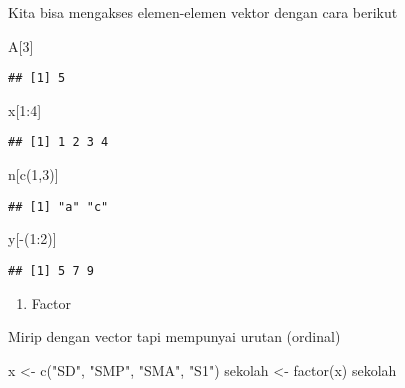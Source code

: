 \documentclass[
]{book}
\newenvironment{Shaded}{\begin{snugshade}}{\end{snugshade}}
\newcommand{\DecValTok}[1]{\textcolor[rgb]{0.00,0.00,0.81}{#1}}
\newcommand{\FunctionTok}[1]{\textcolor[rgb]{0.00,0.00,0.00}{#1}}
\newcommand{\NormalTok}[1]{#1}
\newcommand{\OtherTok}[1]{\textcolor[rgb]{0.56,0.35,0.01}{#1}}
\newcommand{\SpecialCharTok}[1]{\textcolor[rgb]{0.00,0.00,0.00}{#1}}
\newcommand{\StringTok}[1]{\textcolor[rgb]{0.31,0.60,0.02}{#1}}
\providecommand{\tightlist}{%
  \setlength{\itemsep}{0pt}\setlength{\parskip}{0pt}}
\begin{document}
Kita bisa mengakses elemen-elemen vektor dengan cara berikut

\begin{Shaded}
\begin{Highlighting}[]
\NormalTok{A[}\DecValTok{3}\NormalTok{]}
\end{Highlighting}
\end{Shaded}

\begin{verbatim}
## [1] 5
\end{verbatim}

\begin{Shaded}
\begin{Highlighting}[]
\NormalTok{x[}\DecValTok{1}\SpecialCharTok{:}\DecValTok{4}\NormalTok{]}
\end{Highlighting}
\end{Shaded}

\begin{verbatim}
## [1] 1 2 3 4
\end{verbatim}

\begin{Shaded}
\begin{Highlighting}[]
\NormalTok{n[}\FunctionTok{c}\NormalTok{(}\DecValTok{1}\NormalTok{,}\DecValTok{3}\NormalTok{)]}
\end{Highlighting}
\end{Shaded}

\begin{verbatim}
## [1] "a" "c"
\end{verbatim}

\begin{Shaded}
\begin{Highlighting}[]
\NormalTok{y[}\SpecialCharTok{{-}}\NormalTok{(}\DecValTok{1}\SpecialCharTok{:}\DecValTok{2}\NormalTok{)]}
\end{Highlighting}
\end{Shaded}

\begin{verbatim}
## [1] 5 7 9
\end{verbatim}

\begin{enumerate}
\def\labelenumi{\arabic{enumi}.}
\setcounter{enumi}{1}
\tightlist
\item
  Factor
\end{enumerate}

Mirip dengan vector tapi mempunyai urutan (ordinal)

\begin{Shaded}
\begin{Highlighting}[]
\NormalTok{x }\OtherTok{\textless{}{-}} \FunctionTok{c}\NormalTok{(}\StringTok{"SD"}\NormalTok{, }\StringTok{"SMP"}\NormalTok{, }\StringTok{"SMA"}\NormalTok{, }\StringTok{"S1"}\NormalTok{)}
\NormalTok{sekolah }\OtherTok{\textless{}{-}} \FunctionTok{factor}\NormalTok{(x)}
\NormalTok{sekolah}
\end{Highlighting}
\end{Shaded}
\end{document}
